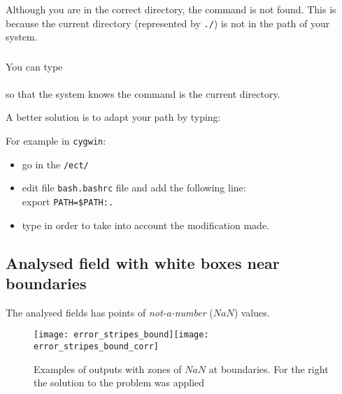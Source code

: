 
\subsubsection{\question}

Although you are in the correct directory, the command is not found. This is because the current directory (represented by \texttt{./}) is not in the path of your system. 

\subsubsection{\answer}

You can type \\
\\
so that the system knows the command is the current directory.

A better solution is to adapt your path by typing:\\

For example in \texttt{cygwin}:\\
\begin{itemize}
\item go in the \texttt{/ect/}
\item edit file \texttt{bash.bashrc} file
and add the following line:\\
export \texttt{PATH=\$PATH:.}
\item type  in order to take into account the modification made.
\end{itemize}



\subsection{Analysed field with white boxes near boundaries}

The analysed fields has points of \textit{not-a-number} ($NaN$) values.

\begin{figure}[htpb]
\centering
\texttt{[image: error\_stripes\_bound]}\texttt{[image: error\_stripes\_bound\_corr]}
\caption{Examples of \diva outputs with zones of $NaN$ at boundaries. For the right the solution to the problem was applied \label{fig:error_stripes}}
\end{figure}

